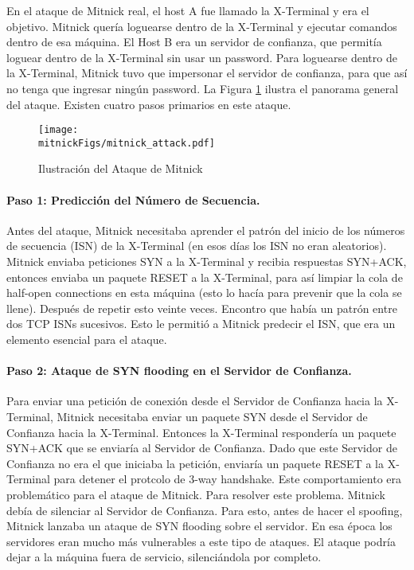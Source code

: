 En el ataque de Mitnick real, el host A fue llamado la X-Terminal y era el objetivo. Mitnick quería loguearse dentro de la X-Terminal y ejecutar comandos dentro de esa máquina.
El Host B era un servidor de confianza, que permitía loguear dentro de la X-Terminal sin usar un password.
Para loguearse dentro de la X-Terminal, Mitnick tuvo que impersonar el servidor de confianza, para que así no tenga que ingresar ningún password. La Figura \ref{tcp:mitnick} ilustra el panorama general del ataque.
Existen cuatro pasos primarios en este ataque.


\begin{figure}[htb]
\centering
\texttt{[image: \\mitnickFigs/mitnick\_attack.pdf]}
\caption{Ilustración del Ataque de Mitnick}
\label{tcp:mitnick}
\end{figure}


\paragraph{Paso 1: Predicción del Número de Secuencia.} 
Antes del ataque, Mitnick necesitaba aprender el patrón del inicio de los números de secuencia (ISN) de la X-Terminal (en esos días los ISN no eran aleatorios).
Mitnick enviaba peticiones SYN a la X-Terminal y recibia respuestas SYN+ACK, entonces enviaba un paquete RESET a la X-Terminal, para así limpiar la cola de half-open connections en esta máquina (esto lo hacía para prevenir que la cola se llene). Después de repetir esto veinte veces. Encontro que había un patrón entre dos TCP ISNs sucesivos. Esto le permitió a Mitnick predecir el ISN, que era un elemento esencial para el ataque.


\paragraph{Paso 2: Ataque de SYN flooding en el Servidor de Confianza.}
Para enviar una petición de conexión desde el Servidor de Confianza hacia la X-Terminal, Mitnick necesitaba enviar un paquete SYN desde el Servidor de Confianza hacia la X-Terminal. Entonces la X-Terminal respondería un paquete SYN+ACK que se enviaría al Servidor de Confianza. Dado que este Servidor de Confianza no era el que iniciaba la petición, enviaría un paquete RESET a la X-Terminal para detener el protcolo de 3-way handshake. Este comportamiento era problemático para el ataque de Mitnick.
Para resolver este problema. Mitnick debía de silenciar al Servidor de Confianza.
Para esto, antes de hacer el spoofing, Mitnick lanzaba un ataque de SYN flooding sobre el servidor. En esa época los servidores eran mucho más vulnerables a este tipo de ataques. El ataque podría dejar a la máquina fuera de servicio, silenciándola por completo.


